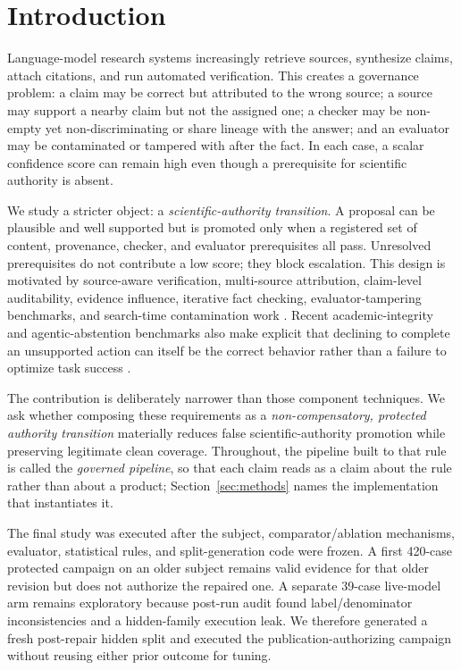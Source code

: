 \section{Introduction}
Language-model research systems increasingly retrieve sources, synthesize claims, attach citations, and run automated verification. This creates a governance problem: a claim may be correct but attributed to the wrong source; a source may support a nearby claim but not the assigned one; a checker may be non-empty yet non-discriminating or share lineage with the answer; and an evaluator may be contaminated or tampered with after the fact. In each case, a scalar confidence score can remain high even though a prerequisite for scientific authority is absent.

We study a stricter object: a \emph{scientific-authority transition}. A proposal can be plausible and well supported but is promoted only when a registered set of content, provenance, checker, and evaluator prerequisites all pass. Unresolved prerequisites do not contribute a low score; they block escalation. This design is motivated by source-aware verification, multi-source attribution, claim-level auditability, evidence influence, iterative fact checking, evaluator-tampering benchmarks, and search-time contamination work \citep{provenanceguard2026,attributionbench2024,aar2026,provenai2026,fire2024,rewardhacking2026,stc2026,deepsciverify2026}. Recent academic-integrity and agentic-abstention benchmarks also make explicit that declining to complete an unsupported action can itself be the correct behavior rather than a failure to optimize task success \citep{sciintegrity2026,agentabstain2026}.

The contribution is deliberately narrower than those component techniques. We ask whether composing these requirements as a \emph{non-compensatory, protected authority transition} materially reduces false scientific-authority promotion while preserving legitimate clean coverage. Throughout, the pipeline built to that rule is called the \emph{governed pipeline}, so that each claim reads as a claim about the rule rather than about a product; Section~\ref{sec:methods} names the implementation that instantiates it.

The final study was executed after the subject, comparator/ablation mechanisms, evaluator, statistical rules, and split-generation code were frozen. A first 420-case protected campaign on an older subject remains valid evidence for that older revision but does not authorize the repaired one. A separate 39-case live-model arm remains exploratory because post-run audit found label/denominator inconsistencies and a hidden-family execution leak. We therefore generated a fresh post-repair hidden split and executed the publication-authorizing campaign without reusing either prior outcome for tuning.

